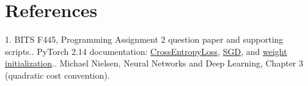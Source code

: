 \documentclass[11pt,a4paper]{article}
\begin{document}
\section{References}

1. BITS F445, Programming Assignment 2 question paper and supporting scripts.. PyTorch 2.14 documentation: \href{https://docs.pytorch.org/docs/2.14/generated/torch.nn.CrossEntropyLoss.html}{CrossEntropyLoss}, \href{https://docs.pytorch.org/docs/2.14/generated/torch.optim.SGD.html}{SGD}, and \href{https://docs.pytorch.org/docs/2.14/nn.init.html}{weight initialization}.. Michael Nielsen, Neural Networks and Deep Learning, Chapter 3 (quadratic cost convention).
\end{document}
